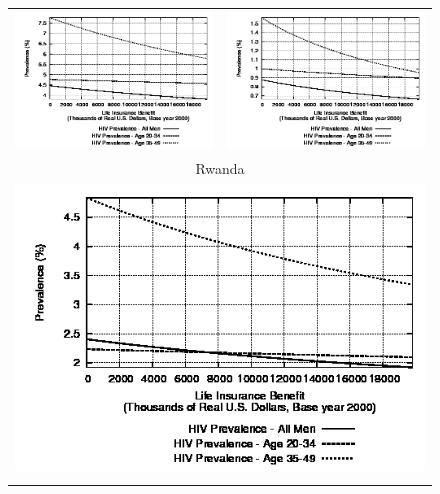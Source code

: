 \documentclass[12pt]{article}
\begin{document}
\begin{figure}
\begin{center}
\begin{tabular}{cc}
\includegraphics[scale=0.44]{images/hivB010_Tanzania.png} & \includegraphics[scale=0.44]{images/hivB010_Ethiopia.png} \\
\multicolumn{2}{c}{Rwanda} \\
\multicolumn{2}{c}{\includegraphics[scale=0.44]{images/hivB010_Rwanda.png}} \\\\

\end{tabular}
\end{center}
\end{figure}
\end{document}
